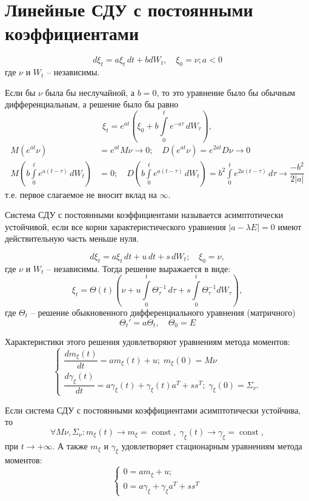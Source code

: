 \section{Линейные СДУ с постоянными коэффициентами}

\begin{ex}
  \[
    d\xi_t = a \xi_t \, dt + b dW_t, \quad \xi_0 = \nu; a < 0
  \]
  где $\nu$ и $W_t$ -- независимы.

  Если бы $\nu$ была бы неслучайной, а $b = 0$, то это уравнение было бы обычным дифференциальным,
  а решение было бы равно
  \[
    \xi_t = e^{at} \left( \xi_0 + b \int\limits_0^t e^{-a\tau} \, dW_\tau \right),
  \]
  \begin{align*}
    M\left(e^{at}\nu\right) &= e^{at} M\nu \to 0; \quad D \left( e^{at} \nu \right) = e^{2at} D\nu \to 0 \\
    M \left( b\int\limits_0^t e^{a(t-\tau)} \, dW_t \right) &= 0; \quad 
    D \left( b\int\limits_0^t e^{a(t-\tau)} \, dW_t \right) = b^2 \int\limits_0^t e^{2a(t-\tau)} \, d\tau \to \dfrac{- b^2}{2 |a|}
  \end{align*}
  т.е. первое слагаемое не вносит вклад на $\infty$.
\end{ex}

\begin{definition}
  Система СДУ с постоянными коэффициентами называется асимптотически устойчивой, если все
  корни характеристического уравнения $|a - \lambda E| = 0$ имеют действительную часть меньше
  нуля.
\end{definition}

\[
  d\xi_t = a \xi_t \, dt + u \, dt + s \, dW_t; \quad \xi_0=\nu,
\]
где $\nu$ и $W_t$ -- независимы. Тогда решение выражается в виде:
\[
  \xi_t = \Theta(t) \left( \nu + u \int\limits_0^t \Theta^{-1}_\tau \, d\tau + s\int\limits_0^t \Theta^{-1}_\tau dW_\tau \right),
\]
где $\Theta_t$ -- решение обыкновенного дифференциального уравнения (матричного)
\[
  \Theta_t' = a \Theta_t, \quad \Theta_0 = E
\]

Характеристики этого решения удовлетворяют уравнениям метода моментов:
\[
  \begin{cases}
    \dfrac{dm_\xi(t)}{dt} = am_\xi(t) + u; \; m_\xi(0) = M\nu \\
    \dfrac{d\gamma_\xi(t)}{dt} = a \gamma_\xi(t) + \gamma_\xi(t) a^T + ss^T; \; \gamma_\xi(0) = \Sigma_\nu.
  \end{cases}
\]

\begin{theorem}
  Если система СДУ с постоянными коэффициентами асимптотически устойчива, то
  \[
    \forall M\nu, \Sigma_\nu :
    m_\xi(t) \to m_\xi = \operatorname{const}, \;
    \gamma_\xi(t) \to \gamma_\xi = \operatorname{const},
  \]
  при $t \to +\infty$. А также $m_\xi$ и $\gamma_\xi$ удовлетворяет стационарным уравнениям
  метода моментов:
  \[
    \begin{cases}
      0 = am_\xi + u; \\
      0 = a \gamma_\xi + \gamma_\xi a^T + ss^T
    \end{cases}
  \]
\end{theorem}

